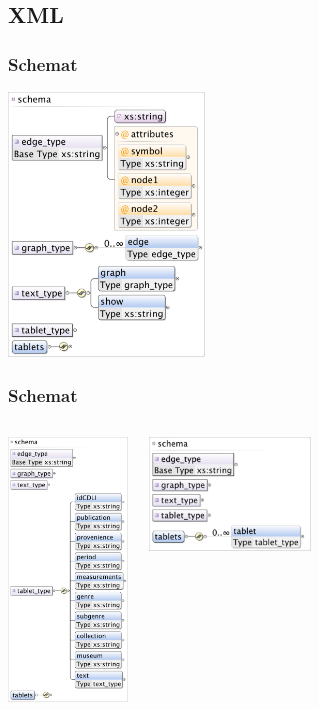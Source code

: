 
\subsection{XML}
\begin{frame}
 \frametitle{Schemat}
\begin{center}
\includegraphics[height=70mm]{../diagramy/schema_text.pdf}
\end{center}

\end{frame}


\begin{frame}
 \frametitle{Schemat}

\begin{columns}[t]
\column{40mm}
\begin{center}
\includegraphics[height=70mm]{../diagramy/schema_tablet.pdf}
\end{center}
\column{40mm}
\begin{center}
\includegraphics[height=30mm]{../diagramy/schema_tablets.pdf}
\end{center}
\end{columns}

\end{frame}



